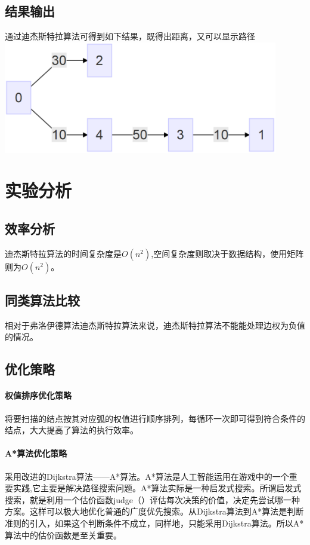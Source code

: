 \documentclass[a4paper,10pt]{ctexart}
\begin{document}
\subsection{结果输出}
通过迪杰斯特拉算法可得到如下结果，既得出距离，又可以显示路径\\
\includegraphics[width=0.9\textwidth]{Test-MinLen.eps}

\section{实验分析}
\subsection{效率分析}
迪杰斯特拉算法的时间复杂度是$O(n^2)$,空间复杂度则取决于数据结构，使用矩阵则为$O(n^2)$。
\subsection{同类算法比较}
相对于弗洛伊德算法迪杰斯特拉算法来说，迪杰斯特拉算法不能能处理边权为负值的情况。
\subsection{优化策略}
\paragraph{权值排序优化策略}
将要扫描的结点按其对应弧的权值进行顺序排列，每循环一次即可得到符合条件的结点，大大提高了算法的执行效率。
\paragraph{A*算法优化策略}
采用改进的Dijkstra算法——A*算法。A*算法是人工智能运用在游戏中的一个重要实践,它主要是解决路径搜索问题。A*算法实际是一种启发式搜索。所谓启发式搜索，就是利用一个估价函数judge（）评估每次决策的价值，决定先尝试哪一种方案。这样可以极大地优化普通的广度优先搜索。从Dijkstra算法到A*算法是判断准则的引入，如果这个判断条件不成立，同样地，只能采用Dijkstra算法。所以A*算法中的估价函数是至关重要。
\end{document}
